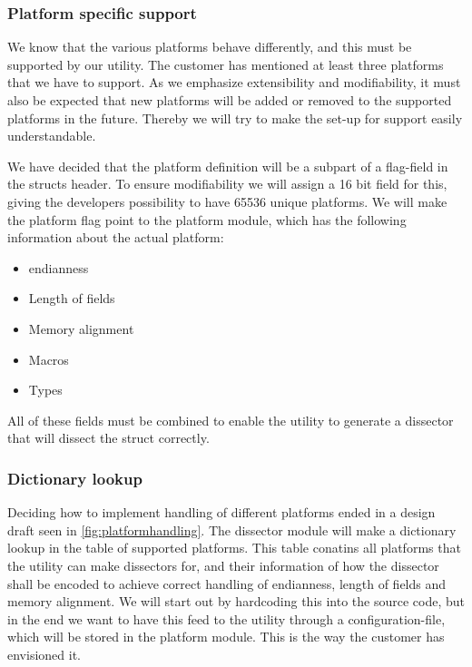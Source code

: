 \subsubsection{Platform specific support}
We know that the various platforms behave differently, and this must be supported by our \gls{utility}. The customer has mentioned at least three platforms that we have to support. As we emphasize extensibility and modifiability, it must also be expected that new platforms will be added or removed to the supported platforms in the future. Thereby we will try to make the set-up for support easily understandable.

We have decided that the platform definition will be a subpart of a flag-field in the \glspl{struct} \gls{header}. To ensure modifiability we will assign a 16 bit field for this, giving the developers possibility to have 65536 unique platforms. We will make the platform flag point to the platform module, which has the following information about the actual platform:
\begin{itemize}
\item \Gls{endianness}
\item Length of fields
\item Memory alignment
\item Macros
\item Types
\end{itemize}
All of these fields must be combined to enable the \gls{utility} to generate a \gls{dissector} that will dissect the \gls{struct} correctly.

\subsubsection{Dictionary lookup}
Deciding how to implement handling of different platforms ended in a design draft seen in \autoref{fig:platformhandling}. The \gls{dissector} module will make a dictionary lookup in the table of supported platforms. This table conatins all platforms that the \gls{utility} can make \glspl{dissector} for, and their information of how the \gls{dissector} shall be encoded to achieve correct handling of \gls{endianness}, length of fields and memory alignment.
We will start out by hardcoding this into the source code, but in the end we want to have this feed to the \gls{utility} through a configuration-file, which will be stored in the platform module. This is the way the customer has envisioned it.  

